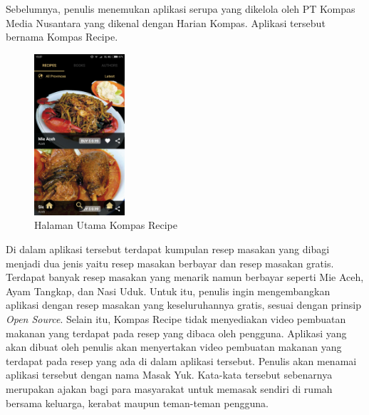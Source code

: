 Sebelumnya, penulis menemukan aplikasi serupa yang dikelola oleh PT Kompas Media Nusantara yang dikenal dengan Harian Kompas. Aplikasi tersebut bernama Kompas Recipe. 
\begin{figure}[H]
	\centering
	\includegraphics[width=0.3\textwidth]{gambar/kompas/utama}
	\caption{Halaman Utama Kompas Recipe}
\end{figure} 
Di dalam aplikasi tersebut terdapat kumpulan resep masakan yang dibagi menjadi dua jenis yaitu resep masakan berbayar dan resep masakan gratis. Terdapat banyak resep masakan yang menarik namun berbayar seperti Mie Aceh, Ayam Tangkap, dan Nasi Uduk. Untuk itu, penulis ingin mengembangkan aplikasi dengan resep masakan yang keseluruhannya gratis, sesuai dengan prinsip \textit{Open Source}. Selain itu, Kompas Recipe tidak menyediakan video pembuatan makanan yang terdapat pada resep yang dibaca oleh pengguna. Aplikasi yang akan dibuat oleh penulis akan menyertakan video pembuatan makanan yang terdapat pada resep yang ada di dalam aplikasi tersebut. Penulis akan menamai aplikasi tersebut dengan nama Masak Yuk. Kata-kata tersebut sebenarnya merupakan ajakan bagi para masyarakat untuk memasak sendiri di rumah bersama keluarga, kerabat maupun teman-teman pengguna.


